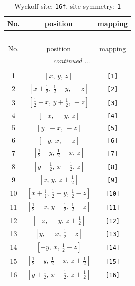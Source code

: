 \documentclass[fleqn,8pt]{jsarticle}
\begin{document}
\begin{longtable}{ccc}
\caption{Wyckoff site: {\tt 16f}, site symmetry: {\tt 1}}
 \\
 \hline \hline
No. & position & mapping \\ \hline \endfirsthead

\multicolumn{2}{l}{\tablename\ \thetable{}} \\
 \hline \hline
No. & position & mapping \\ \hline \endhead

 \hline \hline
\multicolumn{2}{r}{\footnotesize\it continued ...} \\ \endfoot

 \hline \hline
\multicolumn{2}{r}{} \\ \endlastfoot

1 & $\left[ x,\, y,\, z \right]$ & {\tt [1]} \\ \hline
2 & $\left[ x + \frac{1}{2},\, \frac{1}{2} - y,\, - z \right]$ & {\tt [2]} \\ \hline
3 & $\left[ \frac{1}{2} - x,\, y + \frac{1}{2},\, - z \right]$ & {\tt [3]} \\ \hline
4 & $\left[ - x,\, - y,\, z \right]$ & {\tt [4]} \\ \hline
5 & $\left[ y,\, - x,\, - z \right]$ & {\tt [5]} \\ \hline
6 & $\left[ - y,\, x,\, - z \right]$ & {\tt [6]} \\ \hline
7 & $\left[ \frac{1}{2} - y,\, \frac{1}{2} - x,\, z \right]$ & {\tt [7]} \\ \hline
8 & $\left[ y + \frac{1}{2},\, x + \frac{1}{2},\, z \right]$ & {\tt [8]} \\ \hline
9 & $\left[ x,\, y,\, z + \frac{1}{2} \right]$ & {\tt [9]} \\ \hline
10 & $\left[ x + \frac{1}{2},\, \frac{1}{2} - y,\, \frac{1}{2} - z \right]$ & {\tt [10]} \\ \hline
11 & $\left[ \frac{1}{2} - x,\, y + \frac{1}{2},\, \frac{1}{2} - z \right]$ & {\tt [11]} \\ \hline
12 & $\left[ - x,\, - y,\, z + \frac{1}{2} \right]$ & {\tt [12]} \\ \hline
13 & $\left[ y,\, - x,\, \frac{1}{2} - z \right]$ & {\tt [13]} \\ \hline
14 & $\left[ - y,\, x,\, \frac{1}{2} - z \right]$ & {\tt [14]} \\ \hline
15 & $\left[ \frac{1}{2} - y,\, \frac{1}{2} - x,\, z + \frac{1}{2} \right]$ & {\tt [15]} \\ \hline
16 & $\left[ y + \frac{1}{2},\, x + \frac{1}{2},\, z + \frac{1}{2} \right]$ & {\tt [16]} \\
\end{longtable}
\end{document}
